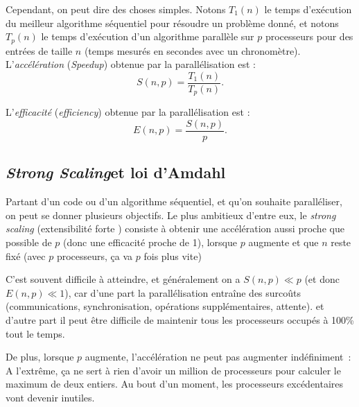 Cependant, on peut dire des choses simples. Notons $T_1(n)$ le temps d'exécution
du meilleur algorithme séquentiel pour résoudre un problème donné, et notons
$T_p(n)$ le temps d'exécution d'un algorithme parallèle sur $p$ processeurs pour
des entrées de taille $n$ (temps mesurés en secondes avec un
chronomètre). L'\emph{accélération} (\textit{Speedup}) obtenue par la
parallélisation est :
\[
  S(n, p) = \frac{T_1(n)}{T_p(n)}.
\]

L'\emph{efficacité} (\textit{efficiency}) obtenue par la parallélisation est :
\[
  E(n, p) = \frac{S(n, p)}{p}.
\]

\subsection{\og \textit{Strong Scaling}\fg et loi d'Amdahl}
\label{sec:strong-scaling}

Partant d'un code ou d'un algorithme séquentiel, et qu'on souhaite paralléliser,
on peut se donner plusieurs objectifs. Le plus ambitieux d'entre eux, le \og
\textit{strong scaling} (\og extensibilité forte \fg) consiste à obtenir une
accélération aussi proche que possible de $p$ (donc une efficacité proche de 1),
lorsque $p$ augmente et que $n$ reste fixé (\og avec $p$ processeurs, ça va $p$
fois plus vite\fg)

C'est souvent difficile à atteindre, et généralement on a $S(n, p) \ll p$ (et
donc $E(n, p) \ll 1$), car d'une part la parallélisation entraîne des surcoûts
(communications, synchronisation, opérations supplémentaires, attente). et
d'autre part il peut être difficile de maintenir tous les processeurs occupés à
100\% tout le temps.

De plus, lorsque $p$ augmente, l'accélération ne peut pas augmenter
indéfiniment~: A l'extrême, ça ne sert à rien d'avoir un million de processeurs
pour calculer le maximum de deux entiers. Au bout d'un moment, les processeurs
excédentaires vont devenir inutiles.

